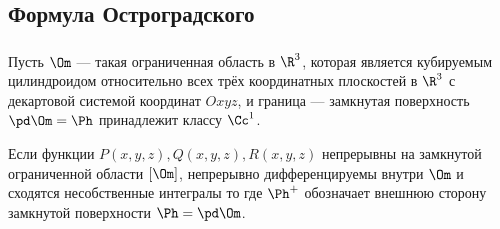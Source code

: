 \documentclass[a4paper]{article}
\begin{document}
\subsection{Формула Остроградского}
\subsubsection{}
\label{p51} Пусть $\Om$ --- такая ограниченная область в $\R^3$,
которая является кубируемым цилиндроидом относительно всех трёх
координатных плоскостей в $\R^3$ с декартовой системой координат
$Oxyz$, и граница --- замкнутая поверхность $\pd\Om=\Ph$ принадлежит
классу $\Cc^1$.

\begin{theorem}
Если функции $P(x,y,z),Q(x,y,z),R(x,y,z)$ непрерывны на замкнутой
ограниченной области $[\Om]$, непрерывно дифференцируемы внутри
$\Om$ и сходятся несобственные интегралы  то
 где $\Ph^+$ обозначает внешнюю
сторону замкнутой поверхности $\Ph=\pd\Om$.
\end{theorem}
\end{document}
